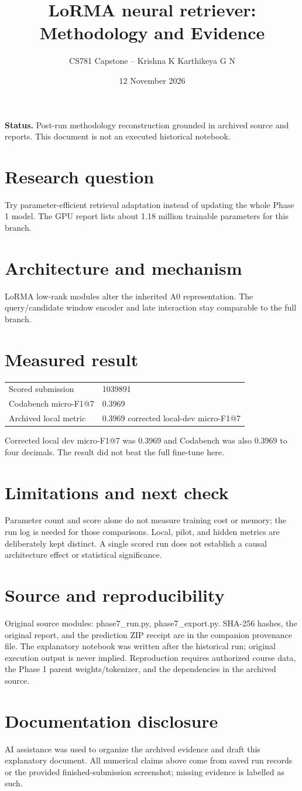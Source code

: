 \documentclass[11pt,a4paper]{article}
\title{LoRMA neural retriever: Methodology and Evidence}
\author{CS781 Capstone -- Krishna K Karthikeya G N}
\date{12 November 2026}
\begin{document}
\maketitle
\noindent\textbf{Status.} Post-run methodology reconstruction grounded in archived source and reports. This document is not an executed historical notebook.\par
\section*{Research question}
Try parameter-efficient retrieval adaptation instead of updating the whole Phase 1 model. The GPU report lists about 1.18 million trainable parameters for this branch.
\section*{Architecture and mechanism}
LoRMA low-rank modules alter the inherited A0 representation. The query/candidate window encoder and late interaction stay comparable to the full branch.
\section*{Measured result}
\begin{center}\begin{tabular}{ll}Scored submission & 1039891\\
Codabench micro-F1@7 & 0.3969\\
Archived local metric & 0.3969 corrected local-dev micro-F1@7\end{tabular}\end{center}
Corrected local dev micro-F1@7 was 0.3969 and Codabench was also 0.3969 to four decimals. The result did not beat the full fine-tune here.
\section*{Limitations and next check}
Parameter count and score alone do not measure training cost or memory; the run log is needed for those comparisons. Local, pilot, and hidden metrics are deliberately kept distinct. A single scored run does not establish a causal architecture effect or statistical significance.
\section*{Source and reproducibility}
Original source modules: phase7\_run.py, phase7\_export.py. SHA-256 hashes, the original report, and the prediction ZIP receipt are in the companion provenance file. The explanatory notebook was written after the historical run; original execution output is never implied. Reproduction requires authorized course data, the Phase 1 parent weights/tokenizer, and the dependencies in the archived source.
\section*{Documentation disclosure}
AI assistance was used to organize the archived evidence and draft this explanatory document. All numerical claims above come from saved run records or the provided finished-submission screenshot; missing evidence is labelled as such.
\end{document}
